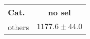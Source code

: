 % 
% 
% 
\renewcommand{\arraystretch}{1.15}
\begin{tabular}{ |l|c| }
    \hline
    Cat.    & no sel             \\
    \hline
     others &  $1177.6 \pm 44.0$ \\
    \hline
\end{tabular}